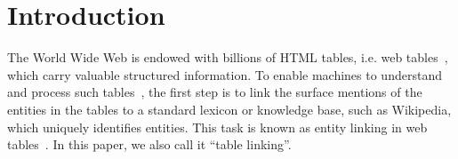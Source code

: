  \section{Introduction}
\label{sec:intro}

The World Wide Web is endowed with billions of HTML tables,
i.e. web tables~\cite{cafarella2008webtables,wang2012understanding}, which carry
valuable structured information. To enable machines to understand and process 
such tables~\cite{wang2012understanding},
the first step is to link the surface mentions of the entities in the 
tables to a standard lexicon or knowledge base, such as Wikipedia, which 
uniquely identifies entities. This task is
known as entity linking in web tables~\cite{bhagavatula2015tabel,wu2016entity}.
In this paper, we also call it ``table linking''.

